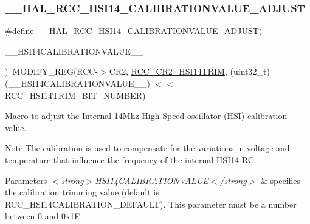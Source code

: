 \subsubsection{\texorpdfstring{\+\_\+\+\_\+\+H\+A\+L\+\_\+\+R\+C\+C\+\_\+\+H\+S\+I14\+\_\+\+C\+A\+L\+I\+B\+R\+A\+T\+I\+O\+N\+V\+A\+L\+U\+E\+\_\+\+A\+D\+J\+U\+ST}{\_\_HAL\_RCC\_HSI14\_CALIBRATIONVALUE\_ADJUST}}
{\footnotesize\ttfamily \#define \+\_\+\+\_\+\+H\+A\+L\+\_\+\+R\+C\+C\+\_\+\+H\+S\+I14\+\_\+\+C\+A\+L\+I\+B\+R\+A\+T\+I\+O\+N\+V\+A\+L\+U\+E\+\_\+\+A\+D\+J\+U\+ST(\begin{DoxyParamCaption}\item[{}]{\+\_\+\+\_\+\+H\+S\+I14\+C\+A\+L\+I\+B\+R\+A\+T\+I\+O\+N\+V\+A\+L\+U\+E\+\_\+\+\_\+ }\end{DoxyParamCaption})~M\+O\+D\+I\+F\+Y\+\_\+\+R\+EG(R\+CC-\/$>$C\+R2, \hyperlink{group___peripheral___registers___bits___definition_ga45b76ccb2dacdf483d281725ce92d61a}{R\+C\+C\+\_\+\+C\+R2\+\_\+\+H\+S\+I14\+T\+R\+IM}, (uint32\+\_\+t)(\+\_\+\+\_\+\+H\+S\+I14\+C\+A\+L\+I\+B\+R\+A\+T\+I\+O\+N\+V\+A\+L\+U\+E\+\_\+\+\_\+) $<$$<$ R\+C\+C\+\_\+\+H\+S\+I14\+T\+R\+I\+M\+\_\+\+B\+I\+T\+\_\+\+N\+U\+M\+B\+ER)}



Macro to adjust the Internal 14\+Mhz High Speed oscillator (H\+SI) calibration value. 

\begin{DoxyNote}{Note}
The calibration is used to compensate for the variations in voltage and temperature that influence the frequency of the internal H\+S\+I14 RC. 
\end{DoxyNote}

\begin{DoxyParams}{Parameters}
{\em $<$strong$>$\+H\+S\+I14\+C\+A\+L\+I\+B\+R\+A\+T\+I\+O\+N\+V\+A\+L\+U\+E$<$/strong$>$} & specifies the calibration trimming value (default is R\+C\+C\+\_\+\+H\+S\+I14\+C\+A\+L\+I\+B\+R\+A\+T\+I\+O\+N\+\_\+\+D\+E\+F\+A\+U\+LT). This parameter must be a number between 0 and 0x1F. \\
\hline
\end{DoxyParams}
\mbox{\label{group___r_c_c___h_s_i14___configuration_ga55588a95af70bea78b741ac53ecd4110}} 
